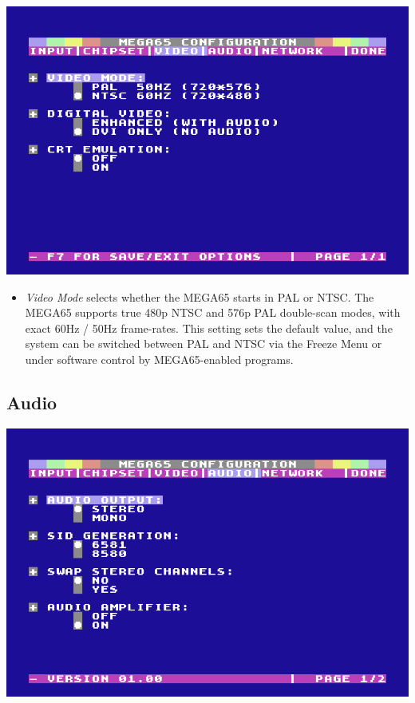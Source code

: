 \includegraphics[width=\linewidth]{images/ss-m65config-3.png}

\begin{itemize}
  \item{\em Video Mode} selects whether the MEGA65 starts in PAL or NTSC.    The MEGA65 supports true 480p NTSC and 576p PAL double-scan modes, with exact 60Hz / 50Hz frame-rates. This setting sets the default value, and the system can be switched between PAL and NTSC via the Freeze Menu or under software control by MEGA65-enabled programs.
\end{itemize}

\subsection{Audio}

\includegraphics[width=\linewidth]{images/ss-m65config-4.png}


